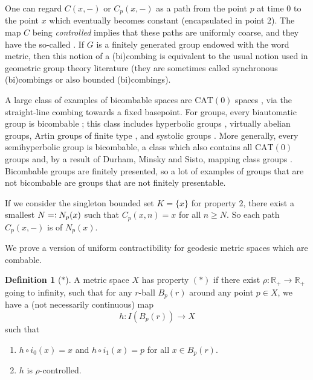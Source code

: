\documentclass {amsart}
\newcommand {\CAT}      {\text{CAT}}
\newcommand {\Rplus}    {\mathbb{R}_{+}}
\theoremstyle {definition}
\newtheorem   {definition}  [theorem] {Definition}
\begin{document}
One can regard \( C(x, - ) \) or \( C_p(x, - ) \) as a path from the point \( p
\) at time \( 0 \) to the point \( x \) which eventually becomes constant
(encapsulated in point 2). The map \( C \) being \emph{controlled} implies
that these paths are uniformly coarse, and they have the so-called
. If \( G \) is a finitely generated group endowed
with the word metric, then this notion of a (bi)combing is
equivalent to the usual notion used in geometric group theory literature (they
are sometimes called synchronous (bi)combings or also bounded (bi)combings).

A large class of examples of bicombable spaces are \( \CAT(0) \) spaces
\cite{bridsonHaefligerMetricSpacesNonpositive1999}, via the straight-line
combing towards a fixed basepoint. For groups, every biautomatic group is
bicombable \cite{epsteinWordProcessingGroups1992}; this class includes
hyperbolic groups \cite{gromovHyperbolicGroups1987}, virtually abelian groups,
Artin groups of finite type \cite{charneyArtinGroupsFiniteType1992}, and
systolic groups \cite{januszkiewiczSimplicialNonpositiveCurvature2006}. More
generally, every semihyperbolic group
\cite{alonsoBridsonSemihyperbolicGroups1995} is bicombable, a class which also
contains all \( \CAT(0) \) groups and, by a result of Durham, Minsky and Sisto,
mapping class groups \cite{durhamMinskySistoStableCubulations2023}. Bicombable
groups are finitely presented, so a lot of examples of groups that are not
bicombable are groups that are not finitely presentable.

If we consider the singleton bounded set \( K = \{ x \} \) for property 2, there
exist a smallest \( N =\vcentcolon N_p(x) \) such that \( C_p(x,n) = x \) for
all \( n \geq N \). So each path \( C_p(x, -) \) is of  \( N_p(x) \).

We prove a  version of uniform contractibility for geodesic metric
spaces which are combable.

\begin{definition} [\( \ast \)]
    \label{def:property-p}
    A metric space \( X \) has property \( (\ast) \) if there exist \( \rho :
    \Rplus \to \Rplus \) going to infinity, such that for any \( r \)-ball \( B
        _{p} (r) \) around any point \( p \in X \), we have a (not necessarily
    continuous) map
    \[
        h: I(B _{p} (r)) \to X
    \]
    such that
    \begin{enumerate}
        \item \( h \circ i_0 (x) = x \) and \( h \circ i_1 (x) = p \) for all \(
            x \in B _{p} (r) \).
        \item \( h \) is \( \rho \)-controlled.
    \end{enumerate}
\end{definition}
\end{document}
